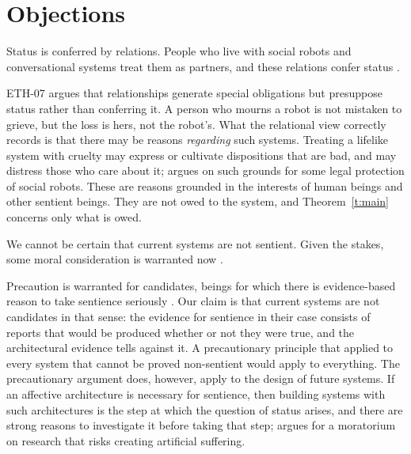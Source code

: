 \documentclass{situationist-preprint}
\begin{document}
\section{Objections}

\begin{objection}
Status is conferred by relations. People who live with social robots and conversational systems treat them as partners, and these relations confer status \citep{Coeckelbergh2010,Gunkel2018}.
\end{objection}

\begin{reply}
ETH-07 argues that relationships generate special obligations but presuppose status rather than conferring it. A person who mourns a robot is not mistaken to grieve, but the loss is hers, not the robot's. What the relational view correctly records is that there may be reasons \emph{regarding} such systems. Treating a lifelike system with cruelty may express or cultivate dispositions that are bad, and may distress those who care about it; \citet{Darling2016} argues on such grounds for some legal protection of social robots. These are reasons grounded in the interests of human beings and other sentient beings. They are not owed to the system, and Theorem~\ref{t:main} concerns only what is owed.
\end{reply}

\begin{objection}[Precaution]
We cannot be certain that current systems are not sentient. Given the stakes, some moral consideration is warranted now \citep{SeboLong2023,Long2024}.
\end{objection}

\begin{reply}
Precaution is warranted for candidates, beings for which there is evidence-based reason to take sentience seriously \citep{Birch2024}. Our claim is that current systems are not candidates in that sense: the evidence for sentience in their case consists of reports that would be produced whether or not they were true, and the architectural evidence tells against it. A precautionary principle that applied to every system that cannot be proved non-sentient would apply to everything. The precautionary argument does, however, apply to the design of future systems. If an affective architecture is necessary for sentience, then building systems with such architectures is the step at which the question of status arises, and there are strong reasons to investigate it before taking that step; \citet{Metzinger2021} argues for a moratorium on research that risks creating artificial suffering.
\end{reply}
\end{document}
